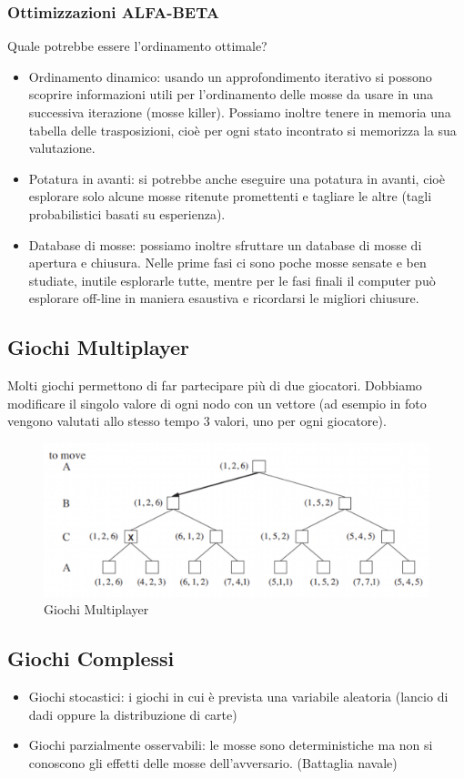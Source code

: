 \documentclass{article}
\begin{document}
\subsubsection{Ottimizzazioni ALFA-BETA}
Quale potrebbe essere l'ordinamento ottimale? 
\begin{itemize}
    \item Ordinamento dinamico: usando un approfondimento iterativo si possono scoprire informazioni utili per l’ordinamento delle mosse da usare in una successiva iterazione (mosse killer). \newline
    Possiamo inoltre tenere in memoria una tabella delle trasposizioni, cioè per ogni stato incontrato si memorizza la sua valutazione.
    \item Potatura in avanti: si potrebbe anche eseguire una potatura in avanti, cioè esplorare solo alcune mosse ritenute promettenti e tagliare le altre (tagli probabilistici basati su esperienza).
    \item Database di mosse: possiamo inoltre sfruttare un database di mosse di apertura e chiusura. Nelle prime fasi ci sono poche mosse sensate e ben studiate, inutile esplorarle tutte, mentre per le fasi finali il computer può esplorare off-line in maniera esaustiva e ricordarsi le migliori chiusure.
\end{itemize}  

\subsection{Giochi Multiplayer}
Molti giochi permettono di far partecipare più di due giocatori. Dobbiamo modificare il singolo valore di ogni nodo con un vettore (ad esempio in foto vengono valutati allo stesso tempo 3 valori, uno per ogni giocatore).
\begin{figure}[H]
\centering
\includegraphics[scale=0.35]{Images/giochimultiplayer.png}
\caption{Giochi Multiplayer}
\end{figure}
\subsection{Giochi Complessi}
\begin{itemize}
    \item Giochi stocastici: i giochi in cui è prevista una variabile aleatoria (lancio di dadi oppure la distribuzione di carte)
    \item Giochi parzialmente osservabili: le mosse sono deterministiche ma non si conoscono gli effetti delle mosse dell'avversario. (Battaglia navale)
\end{itemize}
\end{document}
